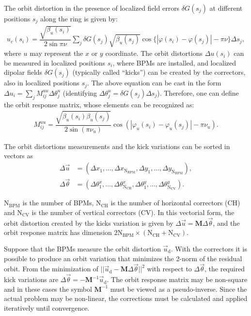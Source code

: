  The orbit distortion in the presence of localized field errors $\delta G(s_j)$ at different positions $s_j$ along the ring is given by:
	\begin{align*}
		u_c(s_i) = \dfrac{\sqrt{\beta_u(s_i)}}{2\sin\pi\nu} \sum_j \delta G({s}_j) \sqrt{\beta_u({s}_j)}\cos\{ |\varphi(s_i) - \varphi({s}_j)| - \pi\nu \} \Delta s_j,
	\end{align*}
	where $u$ may represent the $x$ or $y$ coordinate.  The orbit distortions $\Delta u(s_i)$ can be measured in localized positions $s_i$, where BPMs are installed, and localized dipolar fields $\delta G(s_j)$ (typically called ``kicks'') can be created by the correctors, also in localized positions $s_j$. The above equation can be cast in the form $\Delta u_i = \sum_{j} M_{ij}^{uu} \Delta \theta_{j}^u$ (identifying $\Delta \theta_{j}^u = \delta G(s_j) \Delta s_j$). Therefore, one can define the orbit response matrix, whose elements can be recognized as:
 \begin{align}
 M_{ij}^{uu} = \dfrac{\sqrt{\beta_{u}(s_i)\beta_{u}(s_j)}}{2\sin\left(\pi\nu_{u}\right)}\cos\left( |\varphi_{u}(s_i) - \varphi_{u}(s_j)| - \pi\nu_{u} \right).
 \end{align}

 The orbit distortions measurements and the kick variations can be sorted in vectors as
 \begin{align*}
	 \Delta \vec{u} &= \left(\Delta x_1, \ldots, \Delta x_{\mathrm{N}_{\mathrm{BPM}}}, \Delta y_1, \ldots, \Delta y_{\mathrm{N}_{\mathrm{BPM}}}\right), \\
	 \Delta \vec{\theta} &= \left(\Delta \theta_1^x, \ldots, \Delta \theta_{\mathrm{N}_{\mathrm{CH}}}^x, \Delta \theta_1^y, \ldots, \Delta \theta_{\mathrm{N}_{\mathrm{CV}}}^y\right).
 \end{align*}

 $\mathrm{N}_{\mathrm{BPM}}$ is the number of BPMs, $\mathrm{N}_{\mathrm{CH}}$ is the number of horizontal correctors (CH) and $\mathrm{N}_{\mathrm{CV}}$ is the number of vertical correctors (CV). In this vectorial form, the orbit distortion created by the kicks variation is given by $\Delta \vec{u} = \mathbf{M} \Delta \vec{\theta}$, and the orbit response matrix has dimension $2 \mathrm{N}_{\mathrm{BPM}} \times \left(\mathrm{N}_{\mathrm{CH}} + \mathrm{N}_{\mathrm{CV}}\right)$.

 Suppose that the BPMs measure the orbit distortion $\vec{u}_{\mathrm{d}}$. With the correctors it is possible to produce an orbit variation that minimizes the 2-norm of the residual orbit. From the minimization of $||\vec{u}_{\mathrm{d}} - \mathbf{M}\Delta \vec{\theta}||^2$ with respect to $\Delta\vec{\theta}$, the required kick variations are $\Delta \vec{\theta} = -\mathbf{M}^{-1}\vec{u}_{\mathrm{d}}$. The orbit response matrix may be non-square and in these cases the symbol $\mathbf{M}^{-1}$ must be viewed as a pseudo-inverse. Since the actual problem may be non-linear, the corrections must be calculated and applied iteratively until convergence.

